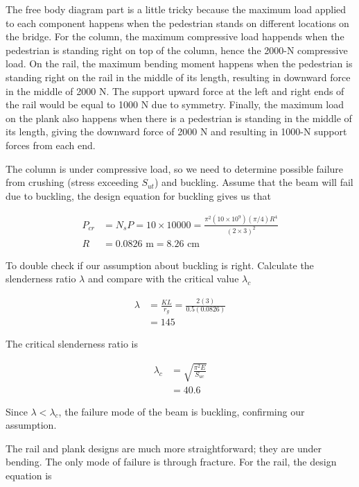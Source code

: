 \documentclass[
10pt,
a4paper,
openany,
svgnames,
]{book}
\begin{document}
\begin{evensolution}
  The free body diagram part is a little tricky because the maximum load applied
  to each component happens when the pedestrian stands on different locations on
  the bridge. For the column, the maximum compressive load happends when the
  pedestrian is standing right on top of the column, hence the 2000-N
  compressive load. On the rail, the maximum bending moment happens when the
  pedestrian is standing right on the rail in the middle of its length,
  resulting in downward force in the middle of 2000 N. The support upward force
  at the left and right ends of the rail would be equal to 1000 N due to
  symmetry. Finally, the maximum load on the plank also happens when there is a
  pedestrian is standing in the middle of its length, giving the downward force
  of 2000 N and resulting in 1000-N support forces from each end.

  The column is under compressive load, so we need to determine possible failure
  from crushing (stress exceeding $S_{ut}$) and buckling. Assume that the beam
  will fail due to buckling, the design equation for buckling gives us that

  \begin{align*}
    P_{cr} &= N_s P = 10 \times 10000 = \frac{\pi^2 (10 \times 10^9) (\pi/4)R^4}{(2 \times 3)^2} \\
    R &= 0.0826 \text{ m} = 8.26 \text{ cm}
  \end{align*}

  To double check if our assumption about buckling is right. Calculate the
  slenderness ratio $\lambda$ and compare with the critical value $\lambda_c$

  \begin{align*}
    \lambda &= \frac{KL}{r_g} = \frac{2(3)}{0.5(0.0826)} \\
            &= 145
  \end{align*}

  The critical slenderness ratio is

  \begin{align*}
    \lambda_c &= \sqrt{\frac{\pi^2 E}{S_{uc}}} \\
              &= 40.6
  \end{align*}

  Since $\lambda < \lambda_c$, the failure mode of the beam is buckling,
  confirming our assumption.

  The rail and plank designs are much more straightforward; they are under
  bending. The only mode of failure is through fracture. For the rail, the
  design equation is


\end{evensolution}
\end{document}
